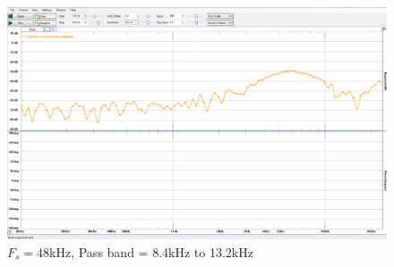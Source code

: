 \documentclass[12pt,a4paper,titlepage]{article}
\begin{document}
\begin{figure}[!htb]
  \centering
  \includegraphics[width=\textwidth]
                  {../presentation/bandpass-final.png}
                  \caption{$F_s = 48$kHz, Pass band = 8.4kHz to 13.2kHz}
                  \label{fig:c2}
\end{figure}


\end{document}
